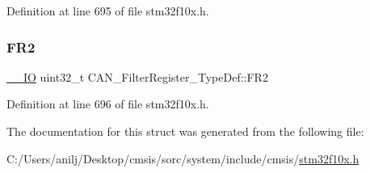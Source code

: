 Definition at line 695 of file stm32f10x.\+h.

\mbox{\label{struct_c_a_n___filter_register___type_def_a77959e28a302b05829f6a1463be7f800}} 
\subsubsection{\texorpdfstring{F\+R2}{FR2}}
{\footnotesize\ttfamily \hyperlink{core__sc300_8h_aec43007d9998a0a0e01faede4133d6be}{\+\_\+\+\_\+\+IO} uint32\+\_\+t C\+A\+N\+\_\+\+Filter\+Register\+\_\+\+Type\+Def\+::\+F\+R2}



Definition at line 696 of file stm32f10x.\+h.



The documentation for this struct was generated from the following file\+:\begin{DoxyCompactItemize}
\item 
C\+:/\+Users/anilj/\+Desktop/cmsis/sorc/system/include/cmsis/\hyperlink{stm32f10x_8h}{stm32f10x.\+h}\end{DoxyCompactItemize}
